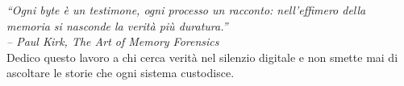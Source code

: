 \begin{dedication}
    \begin{flushright}
        {\small\itshape
        ``Ogni byte è un testimone, ogni processo un racconto: nell'effimero della memoria si nasconde la verità più duratura.''\\
        -- Paul Kirk, \textit{The Art of Memory Forensics} \\[1em]
        }
        \footnotesize
        Dedico questo lavoro a chi cerca verità nel silenzio digitale e non smette mai di ascoltare le storie che ogni sistema custodisce.
    \end{flushright}
\end{dedication}
